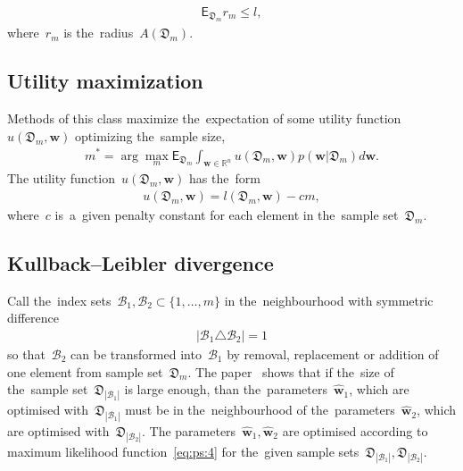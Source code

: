 \documentclass[
11pt,%
tightenlines,%
twoside,%
onecolumn,%
nofloats,%
nobibnotes,%
nofootinbib,%
superscriptaddress,%
noshowpacs,%
centertags]%
{revtex4}
\begin{document}
\begin{equation}
\label{eq:bs:5}
\begin{aligned}
    \mathsf{E}_{\mathfrak{D}_m}r_m\leq l,
\end{aligned}
\end{equation}
where~$r_m$ is the~radius~$A\left(\mathfrak{D}_{m}\right)$.

\subsection{Utility maximization}
Methods of this class maximize the~expectation of some utility function~$u\left(\mathfrak{D}_{m}, \mathbf{w}\right)$ optimizing the~sample size,
\[
\label{eq:bs:6}
\begin{aligned}
    m^* = \arg\max_{m} \mathsf{E}_{\mathfrak{D}_m}\int_{\mathbf{w}\in\mathbb{R}^{n}}u\left(\mathfrak{D}_m, \mathbf{w}\right)p(\mathbf{w}|\mathfrak{D}_m)d\mathbf{w}.
\end{aligned}
\]
The utility function~$u\left(\mathfrak{D}_{m}, \mathbf{w}\right)$ has the~form
\begin{equation}
\label{eq:bs:7}
\begin{aligned}
    u\left(\mathfrak{D}_m, \mathbf{w}\right) = l\left(\mathfrak{D}_m, \mathbf{w}\right) - cm,
\end{aligned}
\end{equation}
 where~$c$ is~a~given penalty constant for each element in the~sample set~$\mathfrak{D}_m$.

\subsection{Kullback--Leibler divergence}
Call the~index sets~$\mathcal{B}_1,\mathcal{B}_2  \subset
\{1,\dots,m\}$ in the~neighbourhood with symmetric difference
\begin{equation}
\label{eq:bs:8}
\begin{aligned}
    \left|\mathcal{B}_1 \triangle \mathcal{B}_2\right| = 1
\end{aligned}
\end{equation}
so that~$\mathcal{B}_2$ can be transformed into~$\mathcal{B}_1$ by
removal,  replacement or addition of one element from sample
set~$\mathfrak{D}_m$. The paper~\cite{motrenko2014} shows that if
the~size of the~sample set~$\mathfrak{D}_{|\mathcal{B}_1|}$ is large
enough, than the~parameters~$\hat{\mathbf{w}}_1$, which are
optimised with~$\mathfrak{D}_{|\mathcal{B}_1|}$ must be in
the~neighbourhood of the~parameters~$\hat{\mathbf{w}}_2$, which are
optimised with~$\mathfrak{D}_{|\mathcal{B}_2|}$. The
parameters~$\hat{\mathbf{w}}_1, \hat{\mathbf{w}}_2$ are optimised
according to maximum likelihood function~\eqref{eq:ps:4} for
the~given sample sets~$\mathfrak{D}_{|\mathcal{B}_1|},
\mathfrak{D}_{|\mathcal{B}_2|}$.
\end{document}
